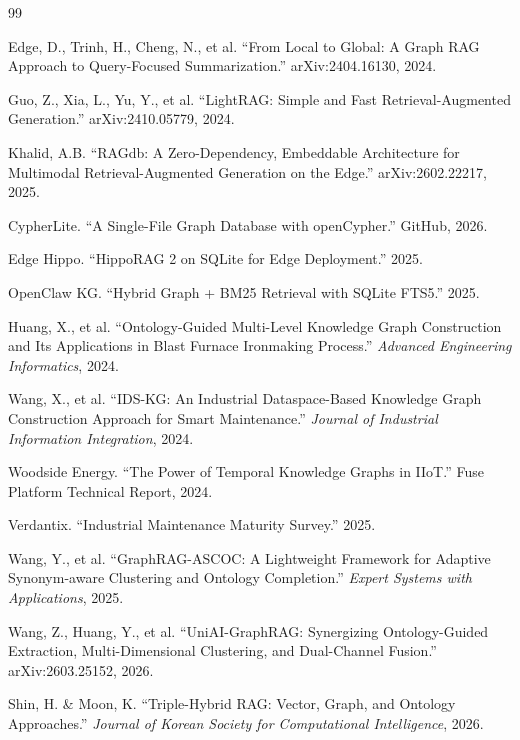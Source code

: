\documentclass[12pt,a4paper]{article}
\begin{document}
\begin{thebibliography}{99}

 Edge, D., Trinh, H., Cheng, N., et al. ``From Local to Global: A Graph RAG Approach to Query-Focused Summarization.'' arXiv:2404.16130, 2024.

 Guo, Z., Xia, L., Yu, Y., et al. ``LightRAG: Simple and Fast Retrieval-Augmented Generation.'' arXiv:2410.05779, 2024.

 Khalid, A.B. ``RAGdb: A Zero-Dependency, Embeddable Architecture for Multimodal Retrieval-Augmented Generation on the Edge.'' arXiv:2602.22217, 2025.

 CypherLite. ``A Single-File Graph Database with openCypher.'' GitHub, 2026.

 Edge Hippo. ``HippoRAG 2 on SQLite for Edge Deployment.'' 2025.

 OpenClaw KG. ``Hybrid Graph + BM25 Retrieval with SQLite FTS5.'' 2025.

 Huang, X., et al. ``Ontology-Guided Multi-Level Knowledge Graph Construction and Its Applications in Blast Furnace Ironmaking Process.'' \emph{Advanced Engineering Informatics}, 2024.

 Wang, X., et al. ``IDS-KG: An Industrial Dataspace-Based Knowledge Graph Construction Approach for Smart Maintenance.'' \emph{Journal of Industrial Information Integration}, 2024.

 Woodside Energy. ``The Power of Temporal Knowledge Graphs in IIoT.'' Fuse Platform Technical Report, 2024.

 Verdantix. ``Industrial Maintenance Maturity Survey.'' 2025.

 Wang, Y., et al. ``GraphRAG-ASCOC: A Lightweight Framework for Adaptive Synonym-aware Clustering and Ontology Completion.'' \emph{Expert Systems with Applications}, 2025.

 Wang, Z., Huang, Y., et al. ``UniAI-GraphRAG: Synergizing Ontology-Guided Extraction, Multi-Dimensional Clustering, and Dual-Channel Fusion.'' arXiv:2603.25152, 2026.

 Shin, H. \& Moon, K. ``Triple-Hybrid RAG: Vector, Graph, and Ontology Approaches.'' \emph{Journal of Korean Society for Computational Intelligence}, 2026.


\end{thebibliography}
\end{document}

